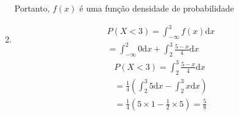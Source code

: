 \begin{example}
\begin{enumerate}[label=(\alph*)]
\begin{enumerate}[leftmargin=*, label=\roman*., widest=IV, align=left]
           \end{enumerate}
           Portanto, $f(x)$ é uma função densidade de probabilidade 
         \item 
           \begin{align*}
             P(X<3)= \int_{-\infty}^{3} f(x)\mathrm{d}x \\
             =\int_{-\infty}^{2} 0 \mathrm{d}x + \int_{2}^{3} \frac{5-x}{4} \mathrm{d}x 
           \end{align*}
           \begin{align*}
             P(X<3)=\int_{2}^{3} \frac{5-x}{4} \mathrm{d}x \\
             = \frac{1}{4} \left(\int_{2}^{3} 5 \mathrm{d}x - \int_{2}^{3} x \mathrm{d}x \right)\\
             =\frac{1}{4} \left(5\times 1- \frac{1}{2}\times 5\right)= \frac{5}{8}
           \end{align*}
       \end{enumerate}
     \end{example}
